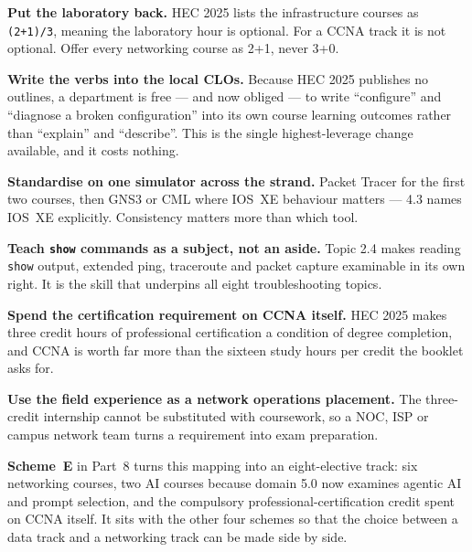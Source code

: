 \documentclass[11pt,a4paper,oneside]{report}
\begin{document}
\begin{recbox}
\begin{tightnum}
  \item \textbf{Put the laboratory back.} HEC 2025 lists the infrastructure
        courses as \texttt{(2+1)/3}, meaning the laboratory hour is optional.
        For a CCNA track it is not optional. Offer every networking course as
        2+1, never 3+0.
  \item \textbf{Write the verbs into the local CLOs.} Because HEC 2025 publishes
        no outlines, a department is free --- and now obliged --- to write
        ``configure'' and ``diagnose a broken configuration'' into its own course
        learning outcomes rather than ``explain'' and ``describe''. This is the
        single highest-leverage change available, and it costs nothing.
  \item \textbf{Standardise on one simulator across the strand.} Packet Tracer
        for the first two courses, then GNS3 or CML where IOS~XE behaviour
        matters --- 4.3 names IOS~XE explicitly. Consistency matters more than
        which tool.
  \item \textbf{Teach \texttt{show} commands as a subject, not an aside.} Topic
        2.4 makes reading \texttt{show} output, extended ping, traceroute and
        packet capture examinable in its own right. It is the skill that
        underpins all eight troubleshooting topics.
  \item \textbf{Spend the certification requirement on CCNA itself.} HEC 2025
        makes three credit hours of professional certification a condition of
        degree completion, and CCNA is worth far more than the sixteen study
        hours per credit the booklet asks for.
  \item \textbf{Use the field experience as a network operations placement.} The
        three-credit internship cannot be substituted with coursework, so a NOC,
        ISP or campus network team turns a requirement into exam preparation.
\end{tightnum}
\end{recbox}

\begin{recbox}
\textbf{Scheme~E} in Part~8 turns this mapping into an eight-elective track: six
networking courses, two AI courses because domain 5.0 now examines agentic AI and
prompt selection, and the compulsory professional-certification credit spent on
CCNA itself. It sits with the other four schemes so that the choice between a
data track and a networking track can be made side by side.
\end{recbox}
\end{document}
